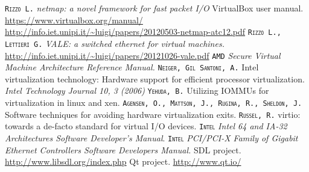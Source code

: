 \documentclass[a4paper, 12pt, titlepage]{report}
\newcommand{\autori}[1]{\textsc{\texttt{#1}}}
\begin{document}
\begin{thebibliography}{30}
 \autori{Rizzo L.} \textit{netmap: a novel framework for fast packet I/O}
 VirtualBox user manual. \url{https://www.virtualbox.org/manual/}
 \url{http://info.iet.unipi.it/~luigi/papers/20120503-netmap-atc12.pdf}
 \autori{Rizzo L., Lettieri G.} \textit{VALE: a switched ethernet for virtual machines.} \url{http://info.iet.unipi.it/~luigi/papers/20121026-vale.pdf}
 \autori{AMD} \textit{Secure Virtual Machine Architecture Reference Manual.}
 \autori{Neiger, Gil Santoni, A.} Intel virtualization technology: Hardware support for efficient processor virtualization. \textit{Intel Technology Journal 10, 3 (2006)}
 \autori{Yehuda, B.} Utilizing IOMMUs for virtualization in linux and xen.
 \autori{Agensen, O., Mattson, J., Rugina, R., Sheldon, J.} Software techniques for avoiding hardware virtualization exits.
 \autori{Russel, R.} virtio: towards a de-facto standard for virtual I/O devices.
 \autori{Intel} \textit{Intel 64 and IA-32 Architectures Software Developer's Manual}.
 \autori{Intel} \textit{PCI/PCI-X Family of Gigabit Ethernet Controllers Software Developers Manual.}
 SDL project. \url{http://www.libsdl.org/index.php}
 Qt project. \url{http://www.qt.io/}
\end{thebibliography}
	
\end{document}
